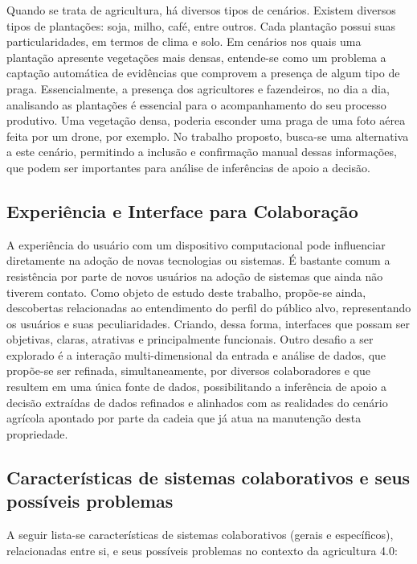 \documentclass[12pt]{article}
\begin{document}
Quando se trata de agricultura, há diversos tipos de cenários. Existem diversos tipos de plantações: soja, milho, café, entre outros. Cada plantação possui suas particularidades, em termos de clima e solo. Em cenários nos quais uma plantação apresente vegetações mais densas, entende-se como um problema a captação automática de evidências que comprovem a presença de algum tipo de praga. Essencialmente, a presença dos agricultores e fazendeiros, no dia a dia, analisando as plantações é essencial para o acompanhamento do seu processo produtivo. Uma vegetação densa, poderia esconder uma praga de uma foto aérea feita por um drone, por exemplo. No trabalho proposto, busca-se uma alternativa a este cenário, permitindo a inclusão e confirmação manual dessas informações, que podem ser importantes para análise de inferências de apoio a decisão.

\subsection{Experiência e Interface para Colaboração}
\label{subsec:experiencia_interface_colaboracao}

A experiência do usuário com um dispositivo computacional pode influenciar diretamente na adoção de novas tecnologias ou sistemas. É bastante comum a resistência por parte de novos usuários na adoção de sistemas que ainda não tiverem contato. Como objeto de estudo deste trabalho, propõe-se ainda, descobertas relacionadas ao entendimento do perfil do público alvo, representando os usuários e suas peculiaridades. Criando, dessa forma, interfaces que possam ser objetivas, claras, atrativas e principalmente funcionais. Outro desafio a ser explorado é a interação multi-dimensional da entrada e análise de dados, que propõe-se ser refinada, simultaneamente, por diversos colaboradores e que resultem em uma única fonte de dados, possibilitando a inferência de apoio a decisão extraídas de dados refinados e alinhados com as realidades do cenário agrícola apontado por parte da cadeia que já atua na manutenção desta propriedade.

\subsection{Características de sistemas colaborativos e seus possíveis problemas}
\label{subsec:caracteristicas_problemas}

A seguir lista-se características de sistemas colaborativos (gerais e específicos), relacionadas entre si, e seus possíveis problemas no contexto da agricultura 4.0:
\end{document}
